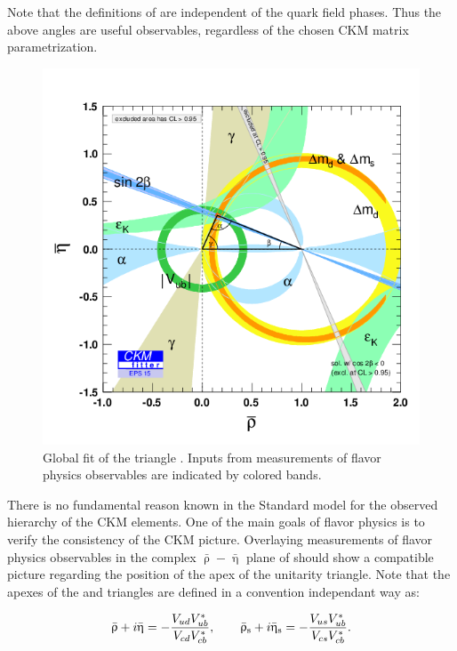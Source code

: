 \noindent Note that the definitions of  are independent of
the quark field phases. Thus the above angles are useful observables, regardless of the chosen
CKM matrix parametrization.

\begin{figure}[!h]
  \centering
    \includegraphics[trim=0cm 0.5cm 0cm 1.5cm, clip=true, width=\textwidth]{Figures/Chapter1/rhoeta_large.png}
    \caption{Global fit of the \Bd triangle \cite{ckm-fitter-phis-pred}.
             Inputs from measurements of flavor physics observables are indicated by colored bands.}
    \label{unitarity_triangle}
\end{figure}

There is no fundamental reason known in the Standard model for the observed hierarchy of the CKM elements.
One of the main goals of flavor physics is to verify the consistency of the CKM picture.
Overlaying measurements of flavor physics observables in the complex $\bar{\uprho}-\bar{\upeta}$ plane
of  should show a compatible picture regarding the position of the
apex of the unitarity triangle. Note that the apexes of the \Bd and \Bs triangles are defined in a
convention independant way as:

\begin{equation}
  \bar{\uprho} + i \bar{\upeta} = -\frac{V_{ud}V_{ub}^*}{V_{cd}V_{cb}^*}, \quad \quad
  \bar{\uprho}_{\rm s} + i \bar{\upeta}_{\rm s} = -\frac{V_{us}V_{ub}^*}{V_{cs}V_{cb}^*}.
  \label{apexes}
\end{equation}

